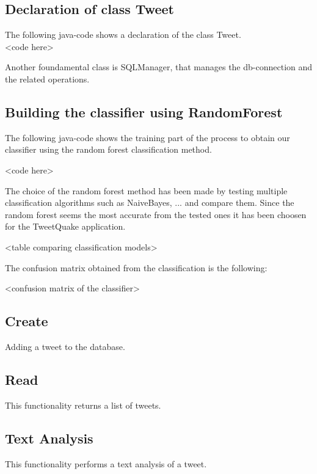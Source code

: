 \documentclass[a4paper, oneside]{article}
\begin{document}
\subsection{Declaration of class Tweet}
The following java-code shows a declaration of the class Tweet.
\vspace{2mm}
\\ <code here>
\vspace{5mm}

\noindent Another foundamental class is SQLManager, that manages the db-connection and the related operations.

\subsection{Building the classifier using RandomForest}
The following java-code shows the training part of the process to obtain our classifier using the random forest classification method.

<code here>

The choice of the random forest method has been made by testing multiple classification algorithms such as NaiveBayes, ... and compare them. Since the random forest seems the most accurate from the tested ones it has been choosen for the TweetQuake application.

<table comparing classification models>

The confusion matrix obtained from the classification is the following:

<confusion matrix of the classifier>

\subsection{Create}
Adding a tweet to the database.
\vspace{2mm}
 \\<Code here>
\vspace{5mm}

\subsection{Read}
This functionality returns a list of tweets.
\vspace{2mm}
\\<code here>
\vspace{5mm}

\clearpage

\subsection{Text Analysis}
This functionality performs a text analysis of a tweet.
\vspace{2mm}
\\<code here>
\vspace{5mm}
\end{document}
